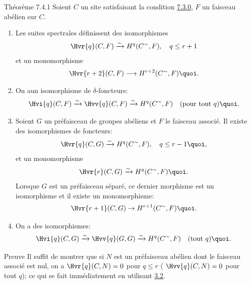 \begin{enonce*}{Théorème 7.4.1}
Soient $C$ un site satisfaisant la condition \hyperref[V.subsubsec7.3.0]{7.3.0}, $F$ un faisceau
abélien sur $C$.
\begin{enumerate}
\renewcommand{\labelenumi}{\theenumi)}
\item Les suites spectrales  définissent des isomorphismes
$$
\Hvr{q} (C, F) \xrightarrow{\sim}
H^q(C^{\sim}, F),\quad q \leq r+1
$$
et un monomorphisme
$$
\Hvr{r+2} (C, F) \longrightarrow
H^{r+2}(C^{\sim}, F){\quoi}.
$$

\item On a\pageoriginale un isomorphisme de $\delta$-foncteurs:
$$
\Hvi{q} (C, F) \xrightarrow{\sim}
\Hvv{q} (C, F)
\xrightarrow{\sim} H^q(C^{\sim}, F)\quad (\text{pour tout } q){\quoi}.
$$

\item Soient $G$ un préfaisceau de groupes abéliens et $F$ le
  faisceau associé. Il existe des isomorphismes de foncteurs:
$$
\Hvr{q} (C, G) \xrightarrow{\sim}
H^q(C^{\sim}, F),\quad q \leq r-1{\quoi},
$$
et un monomorphisme
$$
\Hvr{r}(C, G) \xrightarrow{\sim}
H^q(C^{\sim}, F){\quoi}.
$$
Lorsque $G$ est un préfaisceau séparé, ce dernier morphisme est un
isomorphisme et il existe un monomorphisme:
$$
\Hvr{r+1}(C, G) \to H^{r+1}(C^{\sim},F){\quoi}.
$$

\item On a des isomorphismes:
$$
\Hvi{q}(C, G) \xrightarrow{\sim}
\Hvv{q}(G, G)
\xrightarrow{\sim}H^q(C^{\sim}, F)\quad (\text{tout } q){\quoi}.
$$
\end{enumerate}
\end{enonce*}

\begin{enonce*}[remark]{Preuve}
Il suffit de montrer que si $N$ est un préfaisceau abélien dont le
faisceau associé est nul, on a
$\Hvr{q}(C, N) = 0$ pour $q \leq r$ (\resp
$\Hvv{q}(C, N) = 0$ pour tout
 $q$); ce qui se fait immédiatement en utilisant \hyperref[V.thm3.2]{3.2}.
\end{enonce*}

